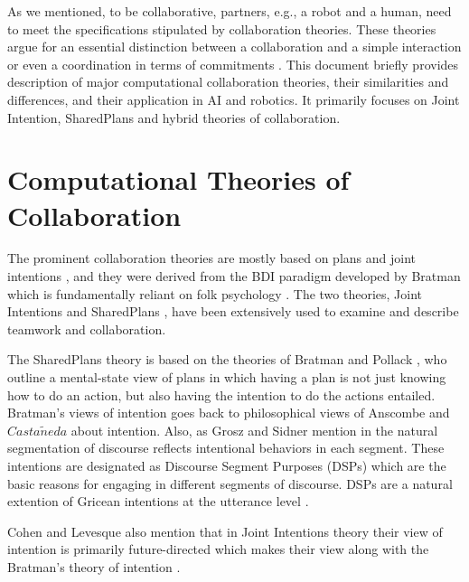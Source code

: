 \documentclass[11pt]{article}
\begin{document}
As we mentioned, to be collaborative, partners, e.g., a robot and a human, need
to meet the specifications stipulated by collaboration theories. These theories
argue for an essential distinction between a collaboration and a simple
interaction or even a coordination in terms of commitments
\cite{grosz:shared-plans, lochbaum:collaborative-planning}. This document
briefly provides description of major computational collaboration theories,
their similarities and differences, and their application in AI and robotics. It
primarily focuses on Joint Intention, SharedPlans and hybrid theories of
collaboration.

\section{Computational Theories of Collaboration}

The prominent collaboration theories are mostly based on plans and joint
intentions \cite{cohen:teamwork} \cite{grosz:plans-discourse}
\cite{Litman:discourse-commonsense}, and they were derived from the BDI
paradigm developed by Bratman \cite{bratman:intentions-plans} which is
fundamentally reliant on folk psychology \cite{ravenscroft:folk}. The two
theories, Joint Intentions \cite{cohen:teamwork} and SharedPlans
\cite{grosz:plans-discourse}, have been extensively used to examine and describe
teamwork and collaboration.

The SharedPlans theory is based on the theories of Bratman and Pollack
\cite{bratman:plans-reasoning,pollack:plan-inference,
pollack:plan-mental-attitudes}, who outline a mental-state view of plans in
which having a plan is not just knowing how to do an action, but also having the
intention to do the actions entailed. Bratman's views of intention goes back to
philosophical views of Anscombe \cite{anscombe:intention} and
$Casta\tilde{n}eda$ \cite{castaneda:thinking} about intention. Also, as Grosz
and Sidner mention in \cite{grosz:plans-discourse} the natural segmentation of
discourse reflects intentional behaviors in each segment. These intentions are
designated as Discourse Segment Purposes (DSPs) which are the basic reasons for
engaging in different segments of discourse. DSPs are a natural extention of
Gricean intentions at the utterance level \cite{neale:grice-language}.

Cohen and Levesque also mention that in Joint Intentions theory their view of
intention is primarily future-directed \cite{cohen:intention-commitment} which
makes their view along with the Bratman's theory of intention
\cite{bratman:intention}.
\end{document}
